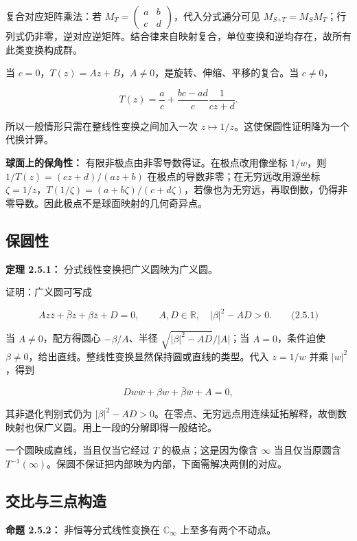 \documentclass[11pt,a4paper]{article}
\begin{document}
复合对应矩阵乘法：若
\(M_T=\begin{pmatrix}a&b\\c&d\end{pmatrix}\)，代入分式通分可见
\(M_{S\circ T}=M_SM_T\)；行列式仍非零，逆对应逆矩阵。结合律来自映射复合，单位变换和逆均存在，故所有此类变换构成群。

当 \(c=0\)，\(T(z)=Az+B\)，\(A\ne0\)，是旋转、伸缩、平移的复合。当
\(c\ne0\)，

\[
T(z)=\frac ac+\frac{bc-ad}{c}\frac1{cz+d}.
\]

所以一般情形只需在整线性变换之间加入一次
\(z\mapsto1/z\)。这使保圆性证明降为一个代换计算。

\textbf{球面上的保角性：} 有限非极点由非零导数得证。在极点改用像坐标
\(1/w\)，则 \(1/T(z)=(cz+d)/(az+b)\)
在极点的导数非零；在无穷远改用源坐标
\(\zeta=1/z\)，\(T(1/\zeta)=(a+b\zeta)/(c+d\zeta)\)，若像也为无穷远，再取倒数，仍得非零导数。因此极点不是球面映射的几何奇异点。

\subsection{保圆性}\label{ch02-s5-ux4fddux5706ux6027}

\textbf{定理 2.5.1：} 分式线性变换把广义圆映为广义圆。

证明：广义圆可写成

\[
Az\bar z+\bar\beta z+\beta\bar z+D=0,
\qquad A,D\in\mathbb R,\quad |\beta|^2-AD>0.
\qquad\text{(2.5.1)}
\]

当 \(A\ne0\)，配方得圆心 \(-\beta/A\)、半径
\(\sqrt{|\beta|^2-AD}/|A|\)；当 \(A=0\)，条件迫使
\(\beta\ne0\)，给出直线。整线性变换显然保持圆或直线的类型。代入
\(z=1/w\) 并乘 \(|w|^2\)，得到

\[
Dw\bar w+\beta w+\bar\beta\bar w+A=0,
\]

其非退化判别式仍为
\(|\beta|^2-AD>0\)。在零点、无穷远点用连续延拓解释，故倒数映射也保广义圆。用上一段的分解即得一般结论。

一个圆映成直线，当且仅当它经过 \(T\) 的极点；这是因为像含 \(\infty\)
当且仅当原圆含
\(T^{-1}(\infty)\)。保圆不保证把内部映为内部，下面需解决两侧的对应。

\subsection{交比与三点构造}\label{ch02-s5-ux4ea4ux6bd4ux4e0eux4e09ux70b9ux6784ux9020}

\textbf{命题 2.5.2：} 非恒等分式线性变换在 \(\mathbb C_\infty\)
上至多有两个不动点。
\end{document}
